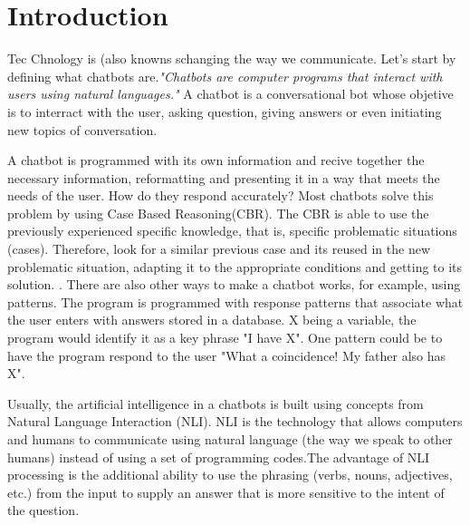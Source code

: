 \documentclass[12pt,twoside]{article}
\theoremstyle{plain}
\theoremstyle{definition}
\theoremstyle{remark}
\begin{document}

\setcounter{tocdepth}{2} 					%
\tableofcontents

\clearpage



\section{Introduction}
\label{sec:introduction}

Tec Chnology is (also knowns schanging the way we communicate. Let's start by defining what chatbots are.\textit{"Chatbots are computer programs that interact with users using natural languages."} \cite{shawar2007chatbots}
A chatbot is a conversational bot whose objetive is to interract with the user, asking question, giving answers or even initiating new topics of conversation. \cite{huang2007extracting}



A chatbot is programmed with its own information and recive together the necessary information, reformatting and presenting it in a way that meets the needs of the user. How do they respond accurately? Most chatbots solve this problem by using Case Based Reasoning(CBR). The CBR is able to use the previously experienced specific knowledge, that is, specific problematic situations (cases). Therefore, look for a similar previous case and its reused in the new problematic situation, adapting it to the appropriate conditions and getting to its solution. \cite{kolodner2014case}. There are also other ways to make a chatbot works, for example, using patterns. The program is programmed with response patterns that associate what the user enters with answers stored in a database. X being a variable, the program would identify it as a key phrase "I have X". One pattern could be to have the program respond to the user "What a coincidence! My father also has X". 


 Usually, the artificial intelligence in a chatbots is built using concepts from Natural Language Interaction (NLI). NLI is the technology that allows computers and humans to communicate using natural language (the way we speak to other humans) instead of using a set of programming codes.The advantage of NLI processing is the additional ability to use the phrasing (verbs, nouns, adjectives, etc.) from the input to supply an answer that is more sensitive to the intent of the question. 
 
\end{document}
